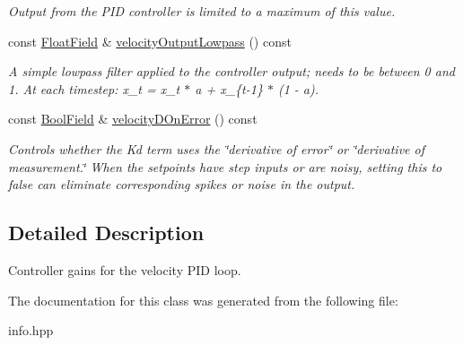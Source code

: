 \begin{DoxyCompactItemize}
\begin{DoxyCompactList}\small\item\em Output from the P\+ID controller is limited to a maximum of this value. \end{DoxyCompactList}\item 
const \hyperlink{classhebi_1_1Info_1_1FloatField}{Float\+Field} \& \hyperlink{classhebi_1_1Info_1_1Settings_1_1Actuator_1_1VelocityGains_a1c21e4265a1970a05d475c5578ecbda8}{velocity\+Output\+Lowpass} () const \hypertarget{classhebi_1_1Info_1_1Settings_1_1Actuator_1_1VelocityGains_a1c21e4265a1970a05d475c5578ecbda8}{}\label{classhebi_1_1Info_1_1Settings_1_1Actuator_1_1VelocityGains_a1c21e4265a1970a05d475c5578ecbda8}

\begin{DoxyCompactList}\small\item\em A simple lowpass filter applied to the controller output; needs to be between 0 and 1. At each timestep\+: x\+\_\+t = x\+\_\+t $\ast$ a + x\+\_\+\{t-\/1\} $\ast$ (1 -\/ a). \end{DoxyCompactList}\item 
const \hyperlink{classhebi_1_1Info_1_1BoolField}{Bool\+Field} \& \hyperlink{classhebi_1_1Info_1_1Settings_1_1Actuator_1_1VelocityGains_ae9a40f9c3b67495bae30aa20821036aa}{velocity\+D\+On\+Error} () const \hypertarget{classhebi_1_1Info_1_1Settings_1_1Actuator_1_1VelocityGains_ae9a40f9c3b67495bae30aa20821036aa}{}\label{classhebi_1_1Info_1_1Settings_1_1Actuator_1_1VelocityGains_ae9a40f9c3b67495bae30aa20821036aa}

\begin{DoxyCompactList}\small\item\em Controls whether the Kd term uses the \char`\"{}derivative of error\char`\"{} or \char`\"{}derivative of measurement.\char`\"{} When the setpoints have step inputs or are noisy, setting this to {\ttfamily false} can eliminate corresponding spikes or noise in the output. \end{DoxyCompactList}\end{DoxyCompactItemize}


\subsection{Detailed Description}
Controller gains for the velocity P\+ID loop. 

The documentation for this class was generated from the following file\+:\begin{DoxyCompactItemize}
\item 
info.\+hpp\end{DoxyCompactItemize}
